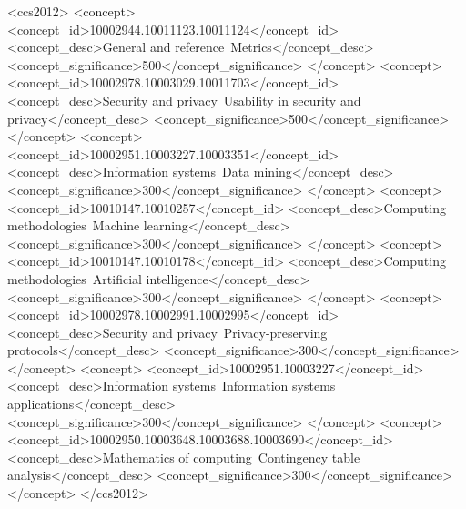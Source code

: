 \documentclass[manuscript,screen,review,anonymous]{acmart}
\begin{document}
\begin{CCSXML}
  <ccs2012>
     <concept>
         <concept_id>10002944.10011123.10011124</concept_id>
         <concept_desc>General and reference~Metrics</concept_desc>
         <concept_significance>500</concept_significance>
         </concept>
     <concept>
         <concept_id>10002978.10003029.10011703</concept_id>
         <concept_desc>Security and privacy~Usability in security and privacy</concept_desc>
         <concept_significance>500</concept_significance>
         </concept>
     <concept>
         <concept_id>10002951.10003227.10003351</concept_id>
         <concept_desc>Information systems~Data mining</concept_desc>
         <concept_significance>300</concept_significance>
         </concept>
     <concept>
         <concept_id>10010147.10010257</concept_id>
         <concept_desc>Computing methodologies~Machine learning</concept_desc>
         <concept_significance>300</concept_significance>
         </concept>
     <concept>
         <concept_id>10010147.10010178</concept_id>
         <concept_desc>Computing methodologies~Artificial intelligence</concept_desc>
         <concept_significance>300</concept_significance>
         </concept>
     <concept>
         <concept_id>10002978.10002991.10002995</concept_id>
         <concept_desc>Security and privacy~Privacy-preserving protocols</concept_desc>
         <concept_significance>300</concept_significance>
         </concept>
     <concept>
         <concept_id>10002951.10003227</concept_id>
         <concept_desc>Information systems~Information systems applications</concept_desc>
         <concept_significance>300</concept_significance>
         </concept>
     <concept>
         <concept_id>10002950.10003648.10003688.10003690</concept_id>
         <concept_desc>Mathematics of computing~Contingency table analysis</concept_desc>
         <concept_significance>300</concept_significance>
         </concept>
   </ccs2012>
\end{CCSXML}
\end{document}
